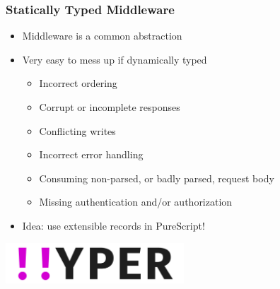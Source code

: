 \begin{frame}
  \frametitle{Statically Typed Middleware}
  \begin{itemize}
    \pause
    \item<+-> Middleware is a common abstraction
    \item<+-> Very easy to mess up if dynamically typed
      \begin{itemize}
        \item<+-> Incorrect ordering
        \item<+-> Corrupt or incomplete responses
        \item<+-> Conflicting writes
        \item<+-> Incorrect error handling
        \item<+-> Consuming non-parsed, or badly parsed, request body
        \item<+-> Missing authentication and/or authorization
      \end{itemize}
    \item<+-> Idea: use extensible records in PureScript!
  \end{itemize}
\end{frame}


%
%


\begin{frame}
  \begin{center}
    \vfill\vfill
    \includegraphics[width=0.5\textwidth]{src/graphics/hyper.png}\\
    \vspace{1em}
    \vfill\vfill
  \end{center}
\end{frame}

